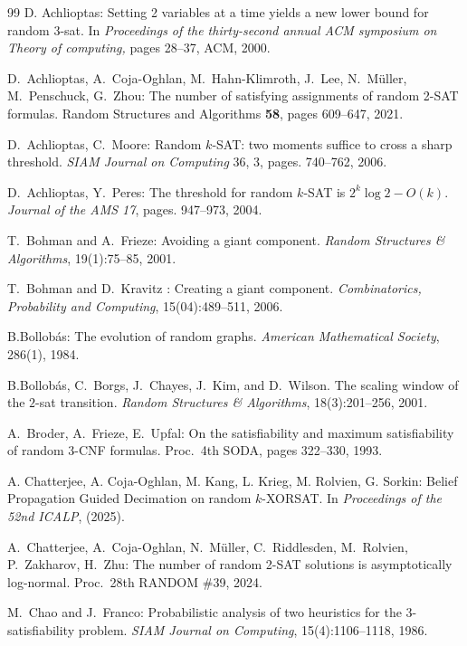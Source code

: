 \documentclass[11pt,reqno]{amsart}
\numberwithin{equation}{section}
\renewcommand{\ln}{\log}
\newcommand{\Bollobas}{Bollob\'as}
\begin{document}
\begin{thebibliography}{99}
	 D. Achlioptas: Setting 2 variables at a time yields a new lower bound for random 3-sat.
	In \emph{Proceedings of the thirty-second annual ACM symposium on Theory of computing,}
	pages 28–37, ACM, 2000.
	

	 D.\ Achlioptas, A.\ Coja-Oghlan, M.\ Hahn-Klimroth, J.\ Lee, N.\ M\"uller, M.\ Penschuck, G.\ Zhou: The number of satisfying assignments of random 2-SAT formulas. Random Structures and Algorithms {\bf58}, pages 609--647, 2021.
	
	 D.~Achlioptas, C.~Moore: Random $k$-SAT: two moments suffice to cross a sharp threshold. \emph{SIAM Journal on Computing} 36, 3, pages. 740--762, 2006.
	

	
	 D.\ Achlioptas, Y.\ Peres: The threshold for random $k$-SAT is $2^k \ln 2 - O(k)$. \emph{Journal of the AMS 17}, pages. 947--973, 2004.

	
	  T.\ Bohman and A.\ Frieze: Avoiding a giant component. \emph{Random Structures \& Algorithms}, 19(1):75–85, 2001.
	
	 T.\ Bohman and D.\ Kravitz : Creating a giant component. \emph{Combinatorics, Probability and Computing}, 15(04):489–511, 2006.
	
	 B.\Bollobas :  The evolution of random graphs. \emph{American Mathematical Society},  286(1),
	1984.
	
	  B.\Bollobas, C.\ Borgs, J.\ Chayes, J.\ Kim, and D.\ Wilson.
	The scaling window of the $2$-sat transition.
	\emph{Random Structures \& Algorithms}, 18(3):201–256, 2001.

	
	 A.~Broder, A.~Frieze, E.~Upfal: On the satisfiability and maximum satisfiability of random 3-CNF formulas.  Proc.\ 4th SODA, pages 322--330, 1993.
	
	
	  A. Chatterjee, A. Coja-Oghlan, M. Kang, L. Krieg, M. Rolvien, G. Sorkin: Belief Propagation Guided Decimation on random $k$-XORSAT. In \emph{Proceedings of the 52nd ICALP}, (2025).
	
	 A.\ Chatterjee, A.\ Coja-Oghlan, N.\ M\"uller, C.\ Riddlesden, M.\ Rolvien, P.\ Zakharov, H.\ Zhu: The number of random 2-SAT solutions is asymptotically log-normal. Proc.\ 28th RANDOM \#39, 2024.
	
	  M.\ Chao and J.\ Franco: Probabilistic analysis of two heuristics for the 3-satisfiability
	problem. \emph{SIAM Journal on Computing}, 15(4):1106–1118, 1986.
	

\end{thebibliography}
\end{document}

